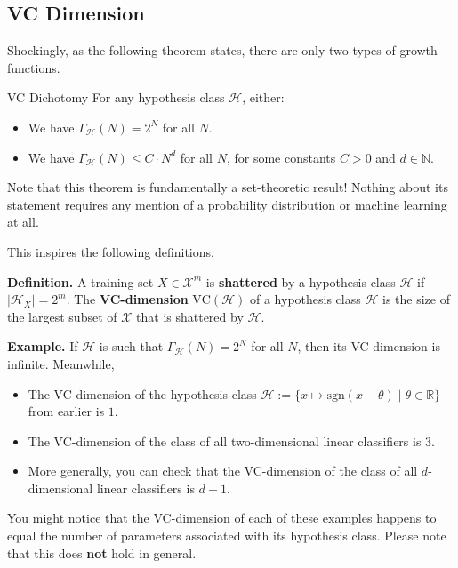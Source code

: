 \subsection{VC Dimension}

Shockingly, as the following theorem states,
there are only two types of growth functions.

\begin{theorem}{VC Dichotomy}
    For any hypothesis class $\mathcal{H}$, either:
    \begin{itemize}
        \item We have $\Gamma_{\mathcal{H}}(N) = 2^N$
        for all $N$.
        \item We have $\Gamma_{\mathcal{H}}(N) \leq C \cdot N^d$
        for all $N$, for some constants $C > 0$ and $d \in \mathbb{N}$.
    \end{itemize}
\end{theorem}

\begin{remark}
    Note that this theorem is fundamentally
    a set-theoretic result!
    Nothing about its statement
    requires any mention of a probability distribution
    or machine learning at all.
\end{remark}

This inspires the following definitions.

\textbf{Definition.}
A training set $X \in \mathcal{X}^m$ is \textbf{shattered}
by a hypothesis class $\mathcal{H}$ if
$|\mathcal{H}_X| = 2^m$.
The \textbf{VC-dimension} $\mathrm{VC}(\mathcal{H})$
of a hypothesis class $\mathcal{H}$
is the size of the largest subset of $\mathcal{X}$
that is shattered by $\mathcal{H}$.

\textbf{Example.} If $\mathcal{H}$ is such that
$\Gamma_{\mathcal{H}}(N) = 2^N$ for all $N$, then
its VC-dimension is infinite.  Meanwhile,
\begin{itemize}
    \item The VC-dimension of the hypothesis class
    $\mathcal{H} := \{x \mapsto \mathrm{sgn}(x - \theta)
    \mid \theta \in \mathbb{R}\}$ from earlier is $1$.
    \item The VC-dimension of the class of
    all two-dimensional linear classifiers is $3$.
    \item More generally, you can check that
    the VC-dimension of the class of all
    $d$-dimensional linear classifiers is $d + 1$.
\end{itemize}

\begin{remark}
    You might notice that
    the VC-dimension of each of these examples
    happens to equal the number of parameters
    associated with its hypothesis class.
    Please note that this does \textbf{not} hold in general.
\end{remark}

